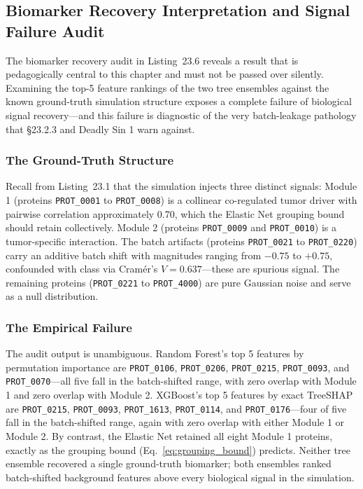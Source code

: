\documentclass[11pt,oneside]{book}
\begin{document}
\subsection{Biomarker Recovery Interpretation and Signal Failure Audit}

The biomarker recovery audit in Listing~23.6 reveals a result that is pedagogically central to this chapter and must not be passed over silently. Examining the top-5 feature rankings of the two tree ensembles against the known ground-truth simulation structure exposes a complete failure of biological signal recovery---and this failure is diagnostic of the very batch-leakage pathology that \S23.2.3 and Deadly Sin 1 warn against.

\subsubsection{The Ground-Truth Structure}
Recall from Listing~23.1 that the simulation injects three distinct signals: Module 1 (proteins \texttt{PROT\_0001} to \texttt{PROT\_0008}) is a collinear co-regulated tumor driver with pairwise correlation approximately 0.70, which the Elastic Net grouping bound should retain collectively. Module 2 (proteins \texttt{PROT\_0009} and \texttt{PROT\_0010}) is a tumor-specific interaction. The batch artifacts (proteins \texttt{PROT\_0021} to \texttt{PROT\_0220}) carry an additive batch shift with magnitudes ranging from $-0.75$ to $+0.75$, confounded with class via Cram\'er's $V = 0.637$---these are spurious signal. The remaining proteins (\texttt{PROT\_0221} to \texttt{PROT\_4000}) are pure Gaussian noise and serve as a null distribution.

\subsubsection{The Empirical Failure}
The audit output is unambiguous. Random Forest's top 5 features by permutation importance are \texttt{PROT\_0106}, \texttt{PROT\_0206}, \texttt{PROT\_0215}, \texttt{PROT\_0093}, and \texttt{PROT\_0070}---all five fall in the batch-shifted range, with zero overlap with Module 1 and zero overlap with Module 2. XGBoost's top 5 features by exact TreeSHAP are \texttt{PROT\_0215}, \texttt{PROT\_0093}, \texttt{PROT\_1613}, \texttt{PROT\_0114}, and \texttt{PROT\_0176}---four of five fall in the batch-shifted range, again with zero overlap with either Module 1 or Module 2. By contrast, the Elastic Net retained all eight Module 1 proteins, exactly as the grouping bound (Eq.~\ref{eq:grouping_bound}) predicts. Neither tree ensemble recovered a single ground-truth biomarker; both ensembles ranked batch-shifted background features above every biological signal in the simulation.
\end{document}
